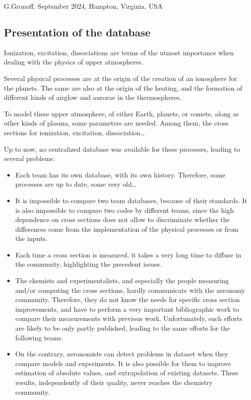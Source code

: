 G.Gronoff,
September 2024, Hampton, Virginia, USA









\subsection{Presentation of the database}



Ionization, excitation, dissociations are terms of the utmost importance when dealing with the physics of upper atmospheres.

Several physical processes are at the origin of the creation of an ionosphere for the planets. The same are also at the origin of the heating, and the formation of different kinds of  airglow and aurorae in the thermospheres.

To model these upper atmosphere, of either Earth, planets, or comets, along as other kinds of plasma, some parameters are needed.
Among them, the cross sections for ionization, excitation, dissociation\ldots

Up to now, no centralized database was available for these processes, leading to several problems:
\begin{itemize}
\item Each team has its own database, with its own history. Therefore, some processes are up to date, some very old\ldots
\item It is impossible to compare two team databases, because of their standards. It is also impossible to compare two codes by different teams, since the high dependence on cross sections does not allow to discriminate whether the differences come from the implementation of the physical processes or from the inputs.
\item Each time a cross section is measured, it takes a very long time to diffuse in the community, highlighting the precedent issues.
\item The chemists and experimentalists, and especially the people measuring and/or computing the cross sections, hardly communicate with the aeronomy community. Therefore, they do not know the needs for specific cross section improvements, and have to perform a very important bibliographic work to compare their measurements with previous work. Unfortunately, such efforts are likely to be only partly published, leading to the same efforts for the following teams. %
\item On the contrary, aeronomists can detect problems in dataset when they compare models and experiments. It is also possible for them to improve estimation of absolute values, and extrapolation of existing datasets. These results, independently of their quality, never reaches the chemistry community.
\end{itemize}

